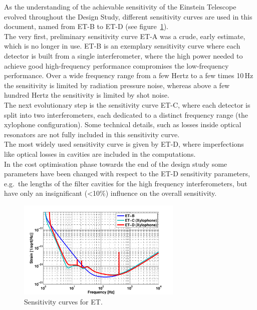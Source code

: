 \begin{tcolorbox}[standard jigsaw,colframe=green!40!black,colback=blanchedalmond!10!white,opacityback=0.6,coltext=black, title= {\bf Sensitivity curves for the Einstein Telescope}]
{As the understanding of the achievable sensitivity of the Einstein Telescope evolved  throughout the Design Study, different sensitivity curves are used in this document,  named from ET-B to ET-D (see figure~\ref{fig:ET_sens_evolution_2}).\\ 
The very first, preliminary sensitivity curve ET-A was a crude, early estimate, which is no longer in use. 
ET-B is an exemplary sensitivity curve where each detector is built from a single interferometer, where the high power needed to achieve good high-frequency performance compromises the low-frequency performance. Over a wide frequency range from a few Hertz to a few times 10\,Hz the sensitivity is limited by radiation pressure noise, whereas above a few hundred Hertz the sensitivity is limited by shot noise.\\
The next evolutionary step is the sensitivity curve ET-C, where each detector is split into two interferometers, each dedicated to a distinct frequency range (the xylophone configuration). Some technical details, such as losses inside optical resonators are not fully included in this sensitivity curve.\\
The most widely used sensitivity curve is given by ET-D, where imperfections like optical losses in cavities are included in the computations.\\
In the cost optimisation phase towards the end of the design study some parameters have been changed with respect to the ET-D sensitivity parameters, e.g.\ the lengths of the filter cavities for the high frequency interferometers, but have only an insignificant (<10\%) influence on the overall sensitivity.
\begin{figure}[H]
	\begin{center}
		\includegraphics[width=0.7\textwidth]{Intro/Intro_Figures/all_sens3.pdf}
\vskip 0.3cm
	\caption{Sensitivity curves for ET.}
	\label{fig:ET_sens_evolution_2}
	\end{center}
\vskip -0.4cm
\end{figure}
}
\end{tcolorbox}



